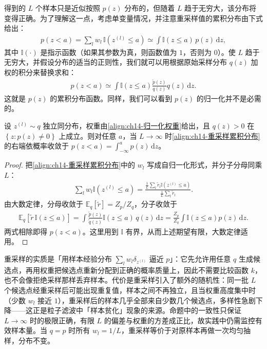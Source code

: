 \documentclass[../../main.tex]{subfiles}
\begin{document}
得到的 $L$ 个样本只是近似按照 $p(z)$ 分布的，但随着 $L$ 趋于无穷大，该分布将变得正确。为了理解这一点，考虑单变量情况，并注意重采样值的累积分布由下式给出：
\begin{align}
p(z<a)=\sum_{l}w_{l}\,\mathbb{I}\!\left(z^{(l)}\leqslant a\right)\simeq\int\mathbb{I}(z\leqslant a)\,p(z)\,\mathrm{d}z,
\label{align:ch14-重采样累积分布}
\end{align}
其中 $\mathbb{I}(\cdot)$ 是指示函数（如果其参数为真，则函数值为 $1$，否则为 $0$）。使 $L$ 趋于无穷大，并假设分布的适当的正则性，我们就可以用根据原始采样分布 $q(z)$ 加权的积分来替换求和：
\begin{align}
p(z<a)\simeq\int\mathbb{I}(z\leqslant a)\frac{\widetilde{p}(z)}{q(z)}q(z)\,\mathrm{d}z.
\label{align:ch14-重采样极限}
\end{align}
这就是 $p(z)$ 的累积分布函数。同样，我们可以看到 $p(z)$ 的归一化并不是必需的。

\begin{proposition}[重采样分布的一致性]\label{proposition:ch14-重采样一致性}
设 $z^{(l)}\sim q$ 独立同分布，权重由\eqref{align:ch14-归一化权重}给出，且 $q(z)>0$ 在 $\left\{z:p(z)\neq0\right\}$ 上成立。则对任意 $a$，当 $L\to\infty$ 时\eqref{align:ch14-重采样累积分布}的右端依概率收敛于 $p(z<a)=\int_{-\infty}^{a}p(z)\,\mathrm{d}z$。
\end{proposition}

\begin{proof}
把\eqref{align:ch14-重采样累积分布}中的 $w_{l}$ 写成自归一化形式，并分子分母同乘 $L$：
\begin{align*}
\sum_{l}w_{l}\mathbb{I}\!\left(z^{(l)}\leqslant a\right)=\frac{\frac{1}{L}\sum_{l}\tilde{r}_{l}\mathbb{I}\!\left(z^{(l)}\leqslant a\right)}{\frac{1}{L}\sum_{l}\tilde{r}_{l}}.
\end{align*}
由大数定律，分母收敛于 $\mathbb{E}_{q}\left[\tilde{r}\right]=Z_{p}/Z_{q}$，分子收敛于
\begin{align*}
\mathbb{E}_{q}\left[\tilde{r}\,\mathbb{I}(z\leqslant a)\right]=\int\frac{\widetilde{p}(z)}{\widetilde{q}(z)}\mathbb{I}(z\leqslant a)\,q(z)\,\mathrm{d}z=\frac{Z_{p}}{Z_{q}}\int\mathbb{I}(z\leqslant a)p(z)\,\mathrm{d}z.
\end{align*}
两式相除即得 $p(z<a)$。这里用到 $\mathbb{I}$ 有界，从而上述期望有限，大数定律适用。
\end{proof}

\begin{remark}重采样的实质是「用样本经验分布 $\sum_{l}w_{l}\delta_{z^{(l)}}$ 逼近 $p$」：它先允许用任意 $q$ 生成候选点，再用权重把候选点重新分配到正确的概率质量上，因此不需要比较函数 $k$，也不会像拒绝采样那样丢弃样本。代价是重采样引入了额外的随机性：同一批 $L$ 个候选点经重采样后可能出现重复值，样本之间不再独立，且当权重高度集中时（少数 $w_{l}$ 接近 $1$），重采样后的样本几乎全部来自少数几个候选点，多样性急剧下降——这正是粒子滤波中「样本贫化」现象的来源。命题中的一致性只保证 $L\to\infty$ 时的极限正确，有限 $L$ 的偏差与权重的方差成正比，故实践中仍需监控有效样本量。当 $q=p$ 时所有 $w_{l}=1/L$，重采样等价于对原样本再做一次均匀抽样，分布不变。
\end{remark}
\end{document}
